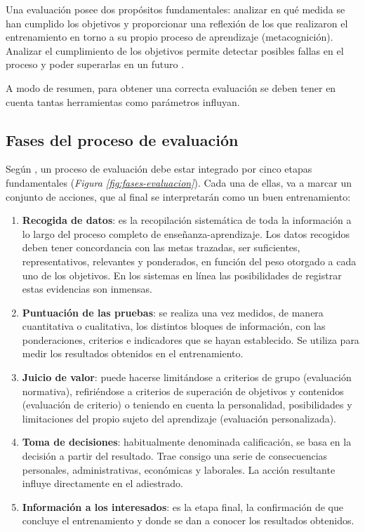 Una evaluación posee dos propósitos fundamentales: analizar en qué medida se han cumplido los objetivos y proporcionar una reflexión de los que realizaron el entrenamiento en torno a su propio proceso de aprendizaje (metacognición). Analizar el cumplimiento de los objetivos permite detectar posibles fallas en el proceso y poder superarlas en un futuro \cite{Aretio2020}.

A modo de resumen, para obtener una correcta evaluación se deben tener en cuenta tantas herramientas como parámetros influyan.

\subsection{Fases del proceso de evaluación}
Según \cite{Aretio2020}, un proceso de evaluación debe estar integrado por cinco etapas fundamentales (\textsl{Figura \ref{fig:fases-evaluacion}}). Cada una de ellas, va a marcar un conjunto de acciones, que al final se interpretarán como un buen entrenamiento:

\begin{enumerate}
\item \textbf{Recogida de datos}: es la recopilación sistemática de toda la información a lo largo del proceso completo de enseñanza-aprendizaje. Los datos recogidos deben tener concordancia con las metas trazadas, ser suficientes, representativos, relevantes y ponderados, en función del peso otorgado a cada uno de los objetivos. En los sistemas en línea las posibilidades de registrar estas evidencias son inmensas.
\item \textbf{Puntuación de las pruebas}: se realiza una vez medidos, de manera cuantitativa o cualitativa, los distintos bloques de información, con las ponderaciones, criterios e indicadores que se hayan establecido. Se utiliza para medir los resultados obtenidos en el entrenamiento.
\item \textbf{Juicio de valor}: puede hacerse limitándose a criterios de grupo (evaluación normativa), refiriéndose a criterios de superación de objetivos y contenidos (evaluación de criterio) o teniendo en cuenta la personalidad, posibilidades y limitaciones del propio sujeto del aprendizaje (evaluación personalizada).
\item \textbf{Toma de decisiones}: habitualmente denominada calificación, se basa en la decisión a partir del resultado. Trae consigo una serie de consecuencias personales, administrativas, económicas y laborales. La acción resultante influye directamente en el adiestrado.
\item \textbf{Información a los interesados}: es la etapa final, la confirmación de que concluye el entrenamiento y donde se dan a conocer los resultados obtenidos.
\end{enumerate}

